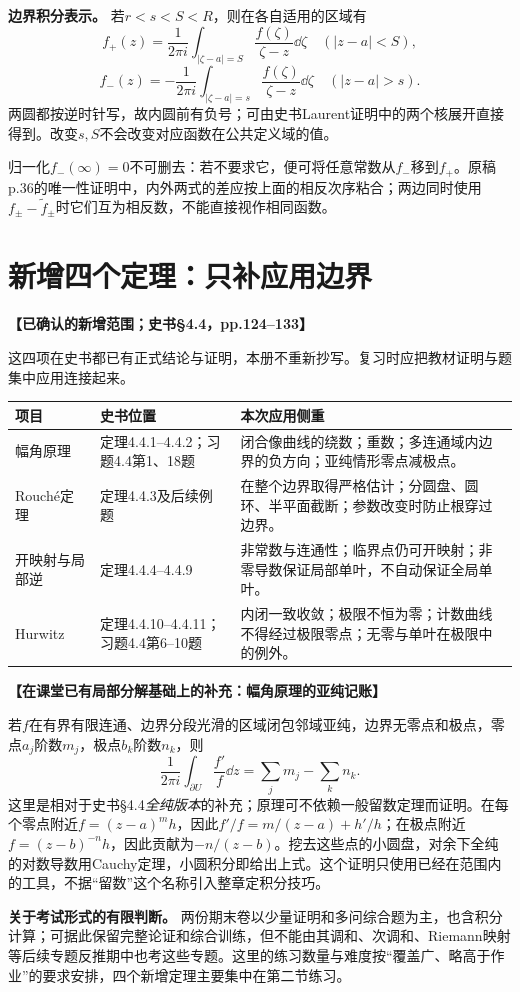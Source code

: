 \documentclass[11pt,a4paper,fontset=fandol]{ctexart}
\theoremstyle{definition}\newtheorem{theorem}{定理}[section]\newtheorem{proposition}[theorem]{命题}\newtheorem{definition}[theorem]{定义}
\newcommand{\src}[1]{\par\noindent\textbf{【#1】}\par\nopagebreak}
\begin{document}
\textbf{边界积分表示。} 若$r<s<S<R$，则在各自适用的区域有
\[f_+(z)=\frac1{2\pi i}\int_{|\zeta-a|=S}\frac{f(\zeta)}{\zeta-z}\dd\zeta\quad(|z-a|<S),\]
\[f_-(z)=-\frac1{2\pi i}\int_{|\zeta-a|=s}\frac{f(\zeta)}{\zeta-z}\dd\zeta\quad(|z-a|>s).\]
两圆都按逆时针写，故内圆前有负号；可由史书Laurent证明中的两个核展开直接得到。改变$s,S$不会改变对应函数在公共定义域的值。

归一化$f_-(\infty)=0$不可删去：若不要求它，便可将任意常数从$f_-$移到$f_+$。原稿p.36的唯一性证明中，内外两式的差应按上面的相反次序粘合；两边同时使用$f_\pm-\widetilde f_\pm$时它们互为相反数，不能直接视作相同函数。

\section{新增四个定理：只补应用边界}
\src{已确认的新增范围；史书§4.4，pp.124--133}
这四项在史书都已有正式结论与证明，本册不重新抄写。复习时应把教材证明与题集中应用连接起来。
\begin{longtable}{p{}p{}p{}}
\toprule 项目 & 史书位置 & 本次应用侧重\\\midrule\endhead
幅角原理 & 定理4.4.1--4.4.2；习题4.4第1、18题 & 闭合像曲线的绕数；重数；多连通域内边界的负方向；亚纯情形零点减极点。\\
Rouché定理 & 定理4.4.3及后续例题 & 在整个边界取得严格估计；分圆盘、圆环、半平面截断；参数改变时防止根穿过边界。\\
开映射与局部逆 & 定理4.4.4--4.4.9 & 非常数与连通性；临界点仍可开映射；非零导数保证局部单叶，不自动保证全局单叶。\\
Hurwitz & 定理4.4.10--4.4.11；习题4.4第6--10题 & 内闭一致收敛；极限不恒为零；计数曲线不得经过极限零点；无零与单叶在极限中的例外。\\
\bottomrule
\end{longtable}

\src{在课堂已有局部分解基础上的补充：幅角原理的亚纯记账}
若$f$在有界有限连通、边界分段光滑的区域闭包邻域亚纯，边界无零点和极点，零点$a_j$阶数$m_j$，极点$b_k$阶数$n_k$，则
\[\frac1{2\pi i}\int_{\partial U}\frac{f'}f\dd z=\sum_jm_j-\sum_kn_k.\]
这里是相对于史书§4.4\emph{全纯版本}的补充；原理可不依赖一般留数定理而证明。在每个零点附近$f=(z-a)^mh$，因此$f'/f=m/(z-a)+h'/h$；在极点附近$f=(z-b)^{-n}h$，因此贡献为$-n/(z-b)$。挖去这些点的小圆盘，对余下全纯的对数导数用Cauchy定理，小圆积分即给出上式。这个证明只使用已经在范围内的工具，不据“留数”这个名称引入整章定积分技巧。

\textbf{关于考试形式的有限判断。} 两份期末卷以少量证明和多问综合题为主，也含积分计算；可据此保留完整论证和综合训练，但不能由其调和、次调和、Riemann映射等后续专题反推期中也考这些专题。这里的练习数量与难度按“覆盖广、略高于作业”的要求安排，四个新增定理主要集中在第二节练习。
\end{document}
